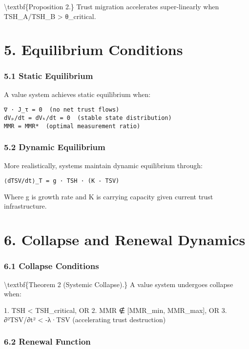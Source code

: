 \documentclass[11pt,oneside]{book}
\begin{document}
\textbackslash textbf\{Proposition 2.\} Trust migration accelerates super-linearly when TSH\_A/TSH\_B > θ\_critical.

\section{5. Equilibrium Conditions}

\subsubsection{5.1 Static Equilibrium}

A value system achieves static equilibrium when:

\begin{verbatim}
∇ · J_τ = 0  (no net trust flows)
dVₚ/dt = dVₖ/dt = 0  (stable state distribution)
MMR = MMR*  (optimal measurement ratio)
\end{verbatim}

\subsubsection{5.2 Dynamic Equilibrium}

More realistically, systems maintain dynamic equilibrium through:

\begin{verbatim}
⟨dTSV/dt⟩_T = g · TSH · (K - TSV)
\end{verbatim}

Where g is growth rate and K is carrying capacity given current trust infrastructure.

\section{6. Collapse and Renewal Dynamics}

\subsubsection{6.1 Collapse Conditions}

\textbackslash textbf\{Theorem 2 (Systemic Collapse).\} A value system undergoes collapse when:

1. TSH < TSH\_critical, OR
2. MMR ∉ [MMR\_min, MMR\_max], OR  
3. ∂²TSV/∂t² < -λ·TSV (accelerating trust destruction)

\subsubsection{6.2 Renewal Function}
\end{document}
